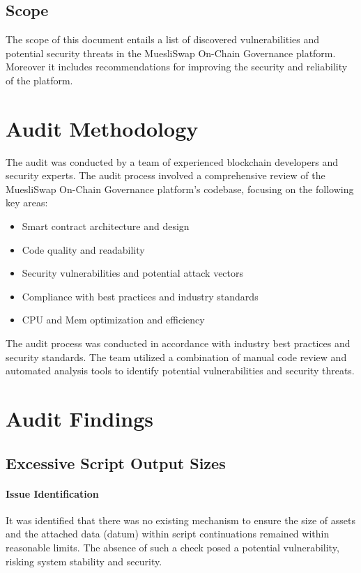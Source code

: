 \documentclass[11pt]{article}
\begin{document}
\subsection{Scope}
The scope of this document entails a list of discovered vulnerabilities and potential security threats in the MuesliSwap On-Chain Governance platform.
Moreover it includes recommendations for improving the security and reliability of the platform.

\section{Audit Methodology}
The audit was conducted by a team of experienced blockchain developers and security experts.
The audit process involved a comprehensive review of the MuesliSwap On-Chain Governance platform's codebase, focusing on the following key areas:

\begin{itemize}
    \item Smart contract architecture and design
    \item Code quality and readability
    \item Security vulnerabilities and potential attack vectors
    \item Compliance with best practices and industry standards
    \item CPU and Mem optimization and efficiency
\end{itemize}

The audit process was conducted in accordance with industry best practices and security standards.
The team utilized a combination of manual code review and automated analysis tools to identify potential vulnerabilities and security threats.

\section{Audit Findings}

\subsection{Excessive Script Output Sizes}

\paragraph{Issue Identification}
It was identified that there was no existing mechanism to ensure the size of assets and the attached data (datum) within script continuations remained within reasonable limits. The absence of such a check posed a potential vulnerability, risking system stability and security.
\end{document}
